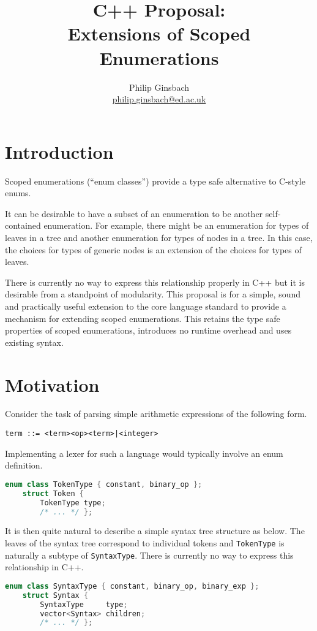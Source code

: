 \documentclass{scrartcl}
\author{Philip Ginsbach\\\url{philip.ginsbach@ed.ac.uk}}
\title{C++ Proposal:\\Extensions of Scoped Enumerations}
\begin{document}
\maketitle
\tableofcontents
\newpage
\section{Introduction}
Scoped enumerations (``enum classes'') provide a type safe alternative to C-style enums.

It can be desirable to have a subset of an enumeration to be another self-contained enumeration.
For example, there might be an enumeration for types of leaves in a tree and another enumeration for types of nodes in a tree.
In this case, the choices for types of generic nodes is an extension of the choices for types of leaves.

There is currently no way to express this relationship properly in C++ but it is desirable from a standpoint of modularity.
This proposal is for a simple, sound and practically useful extension to the core language standard to provide a mechanism for extending scoped enumerations.
This retains the type safe properties of scoped enumerations, introduces no runtime overhead and uses existing syntax.

\section{Motivation}
Consider the task of parsing simple arithmetic expressions of the following form.

\begin{lstlisting}[language={}]
     term ::= <term><op><term>|<integer>
\end{lstlisting}

\noindent
Implementing a lexer for such a language would typically involve an enum definition.

\begin{lstlisting}[language=C++]
    enum class TokenType { constant, binary_op };
    struct Token {
        TokenType type;
        /* ... */ };
\end{lstlisting}

\noindent
It is then quite natural to describe a simple syntax tree structure as below.
The leaves of the syntax tree correspond to individual tokens and \texttt{TokenType} is naturally a subtype of \texttt{SyntaxType}.
There is currently no way to express this relationship in C++.

\begin{lstlisting}[language=C++]
    enum class SyntaxType { constant, binary_op, binary_exp };
    struct Syntax {
        SyntaxType     type;
        vector<Syntax> children;
        /* ... */ };
\end{lstlisting}
\end{document}
